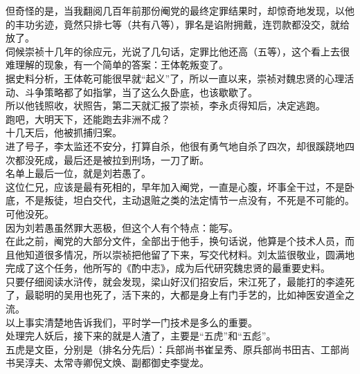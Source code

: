 \begin{multicols}{\theparacolNo}
但奇怪的是，当我翻阅几百年前那份阉党的最终定罪结果时，却惊奇地发现，以他的丰功劣迹，竟然只排七等（共有八等），罪名是谄附拥戴，连罚款都没交，就给放了。\\

伺候崇祯十几年的徐应元，光说了几句话，定罪比他还高（五等），这个看上去很难理解的现象，有一个简单的答案：王体乾叛变了。\\

据史料分析，王体乾可能很早就“起义”了，所以一直以来，崇祯对魏忠贤的心理活动、斗争策略都了如指掌，当了这么久卧底，也该歇歇了。\\

所以他钱照收，状照告，第二天就汇报了崇祯，李永贞得知后，决定逃跑。\\

跑吧，大明天下，还能跑去非洲不成？\\

十几天后，他被抓捕归案。\\

进了号子，李太监还不安分，打算自杀，他很有勇气地自杀了四次，却很蹊跷地四次都没死成，最后还是被拉到刑场，一刀了断。\\

名单上最后一位，就是刘若愚了。\\

这位仁兄，应该是最有死相的，早年加入阉党，一直是心腹，坏事全干过，不是卧底，不是叛徒，坦白交代，主动退赃之类的法定情节一点没有，不死是不可能的。\\

可他没死。\\

因为刘若愚虽然罪大恶极，但这个人有个特点：能写。\\

在此之前，阉党的大部分文件，全部出于他手，换句话说，他算是个技术人员，而且他知道很多情况，所以崇祯把他留了下来，写交代材料。刘太监很敬业，圆满地完成了这个任务，他所写的《酌中志》，成为后代研究魏忠贤的最重要史料。\\

只要仔细阅读水浒传，就会发现，梁山好汉们招安后，宋江死了，最能打的李逵死了，最聪明的吴用也死了，活下来的，大都是身上有门手艺的，比如神医安道全之流。\\

以上事实清楚地告诉我们，平时学一门技术是多么的重要。\\

处理完人妖后，接下来的就是人渣了，主要是“五虎”和“五彪”。\\

五虎是文臣，分别是（排名分先后）：兵部尚书崔呈秀、原兵部尚书田吉、工部尚书吴淳夫、太常寺卿倪文焕、副都御史李燮龙。\\


\end{multicols}
